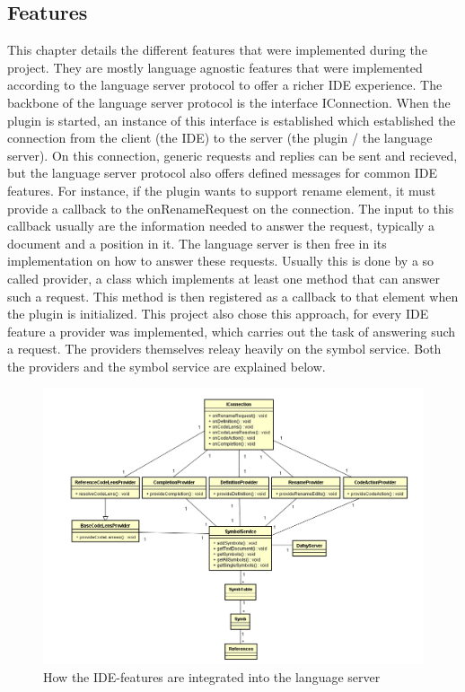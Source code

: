 \subsection{Features} \label{features}
This chapter details the different features that were implemented during the project. They are mostly language agnostic features that were implemented according to the language server protocol to offer a richer IDE experience. The backbone of the language server protocol is the interface IConnection. When the plugin is started, an instance of this interface is established which established the connection from the client (the IDE) to the server (the plugin / the language server). On this connection, generic requests and replies can be sent and recieved, but the language server protocol also offers defined messages for common IDE features. \newline
For instance, if the plugin wants to support rename element, it must provide a callback to the onRenameRequest on the connection. The input to this callback usually are the information needed to answer the request, typically a document and a position in it. The language server is then free in its implementation on how to answer these requests. \newline
Usually this is done by a so called provider, a class which implements at least one method that can answer such a request. This method is then registered as a callback to that element when the plugin is initialized.\newline
This project also chose this approach, for every IDE feature a provider was implemented, which carries out the task of answering such a request. The providers themselves releay heavily on the symbol service. Both the providers and the symbol service are explained below. 


\begin{figure}[H]
	\centering
	\includegraphics[width=1\textwidth]{img/featureArchitecture}
	\caption{How the IDE-features are integrated into the language server}
	\label{fig:featurearchitecture}
\end{figure}



